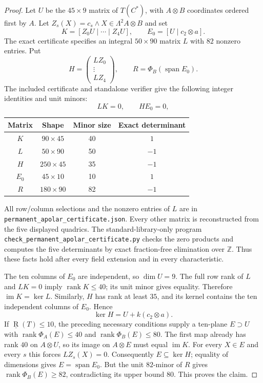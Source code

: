 \begin{proof}
Let $U$ be the $45\times9$ matrix of $T(C^*)$, with $A\otimes B$
coordinates ordered first by $A$. Let
$Z_s(X)=c_s\wedge X\in\Lambda^2A\otimes B$ and set
\[
 K=[Z_0U\mid\cdots\mid Z_4U],\qquad
 E_0=[U\mid c_2\otimes a].
\]
The exact certificate specifies an integral $50\times90$
matrix $L$ with $82$ nonzero entries. Put
\[
 H=\begin{pmatrix}LZ_0\\\vdots\\LZ_4\end{pmatrix},
 \qquad R=\Phi_B(\operatorname{span}E_0).
\]
The included certificate and standalone verifier give the
following integer identities and unit minors:
\[
 LK=0,\qquad HE_0=0,
\]
\begin{center}
\begin{tabular}{c|c|c|c}
Matrix&Shape&Minor size&Exact determinant\\\hline
$K$&$90\times45$&40&$1$\\
$L$&$50\times90$&50&$-1$\\
$H$&$250\times45$&35&$-1$\\
$E_0$&$45\times10$&10&$1$\\
$R$&$180\times90$&82&$-1$
\end{tabular}
\end{center}
All row/column selections and the nonzero entries of $L$ are
in \texttt{permanent\_apolar\_certificate.json}. Every other
matrix is reconstructed from the five displayed quadrics.
The standard-library-only program
\texttt{check\_permanent\_apolar\_certificate.py} checks the
zero products and computes the five determinants by exact
fraction-free elimination over $\mathbb Z$. Thus these facts
hold after every field extension and in every characteristic.

The ten columns of $E_0$ are independent, so $\dim U=9$.
The full row rank of $L$ and $LK=0$ imply
$\operatorname{rank}K\leq40$; its unit minor gives equality.
Therefore $\operatorname{im}K=\ker L$. Similarly, $H$ has
rank at least $35$, and its kernel contains the ten
independent columns of $E_0$. Hence
\[
 \ker H=U+k(c_2\otimes a).
\]
If $\underline{\operatorname R}(T)\leq10$, the preceding necessary conditions supply a
ten-plane $E\supset U$ with
$\operatorname{rank}\Phi_A(E)\leq40$ and
$\operatorname{rank}\Phi_B(E)\leq80$.
The first map already has rank $40$ on $A\otimes U$, so
its image on $A\otimes E$ must equal $\operatorname{im}K$.
For every $X\in E$ and every $s$ this forces
$LZ_s(X)=0$. Consequently $E\subseteq\ker H$; equality of
dimensions gives $E=\operatorname{span}E_0$. But the unit
$82$-minor of $R$ gives $\operatorname{rank}\Phi_B(E)\geq82$,
contradicting its upper bound $80$. This proves the claim.
\end{proof}

